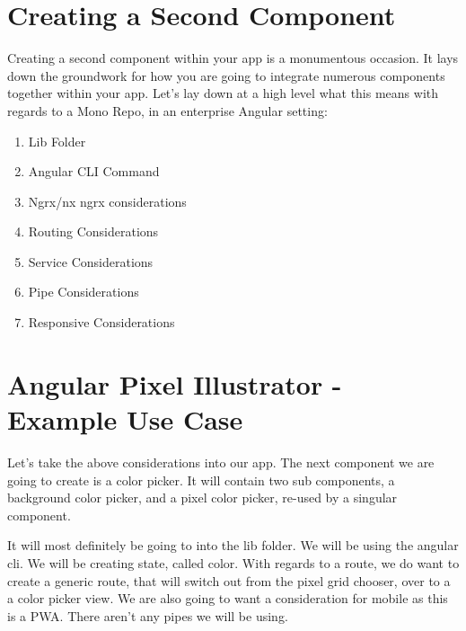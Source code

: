 \maketitle{}
\section{ Creating a Second Component }
Creating a second component within your app is a monumentous occasion. It lays
down the groundwork for how you are going to integrate numerous components
together within your app. Let's lay down at a high level what this means with
regards to a Mono Repo, in an enterprise Angular setting:

\begin{enumerate}
  \item Lib Folder
  \item Angular CLI Command
  \item Ngrx/nx ngrx considerations
  \item Routing Considerations
  \item Service Considerations
  \item Pipe Considerations
  \item Responsive Considerations
\end{enumerate}

\section{ Angular Pixel Illustrator - Example Use Case }
Let's take the above considerations into our app. The next component we are
going to create is a color picker. It will contain two sub components, a
background color picker, and a pixel color picker, re-used by a singular
component.

It will most definitely be going to into the lib folder. We will be using the
angular cli. We will be creating state, called color. With regards to a route,
we do want to create a generic route, that will switch out from the pixel grid
chooser, over to a a color picker view. We are also going to want a
consideration for mobile as this is a PWA. There aren't any pipes we will be
using.

